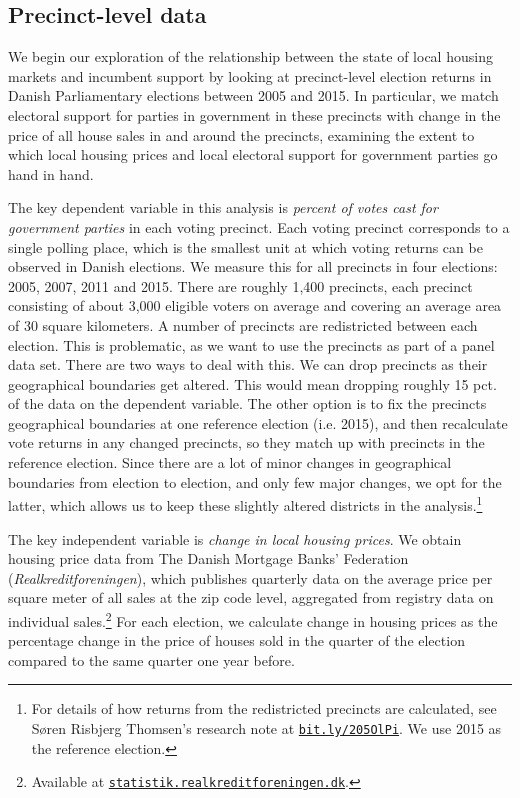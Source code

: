 \documentclass[12pt,a4paper]{article}
\begin{document}
	\subsection{Precinct-level data}\label{precinctlevel}
	We begin our exploration of the relationship between the state of local housing markets and incumbent support by looking at precinct-level election returns in Danish Parliamentary elections between 2005 and 2015. In particular, we match electoral support for parties in government in these precincts with change in the price of all house sales in and around the precincts, examining the extent to which local housing prices and local electoral support for government parties go hand in hand.
	

	The key dependent variable in this analysis is \textit{percent of votes cast for government parties} in each voting precinct. Each voting precinct corresponds to a single polling place, which is the smallest unit at which voting returns can be observed in Danish elections. We measure this for all precincts in four elections:  2005, 2007, 2011 and 2015. There are roughly 1,400 precincts, each precinct consisting of about 3,000 eligible voters on average and covering an average area of 30 square kilometers. A number of precincts are redistricted between each election. This is problematic, as we want to use the precincts as part of a panel data set. There are two ways to deal with this. We can drop precincts as their geographical boundaries get altered. This would mean dropping roughly 15 pct. of the data on the dependent variable. The other option is to fix the precincts geographical boundaries at one reference election (i.e. 2015), and then recalculate vote returns in any changed precincts, so they match up with precincts in the reference election. Since there are a lot of minor changes in geographical boundaries from election to election, and only few major changes, we opt for the latter, which allows us to keep these slightly altered districts in the analysis.\footnote{For details of how returns from the redistricted precincts are calculated, see Søren Risbjerg Thomsen's research note at \texttt{\href{http://bit.ly/205OlPi}{bit.ly/205OlPi}}.  We use 2015 as the reference election.}
	
	The key independent variable is \textit{change in local housing prices}. We obtain housing price data from The Danish Mortgage Banks' Federation (\textit{Realkreditforeningen}), which publishes quarterly data on the average price per square meter of all sales at the zip code level, aggregated from registry data on individual sales.\footnote{Available at \texttt{\href{http://statistik.realkreditforeningen.dk/}{statistik.realkreditforeningen.dk}}.} For each election, we calculate change in housing prices as the percentage change in the price of houses sold in the quarter of the election compared to the same quarter one year before.
	
\end{document}
